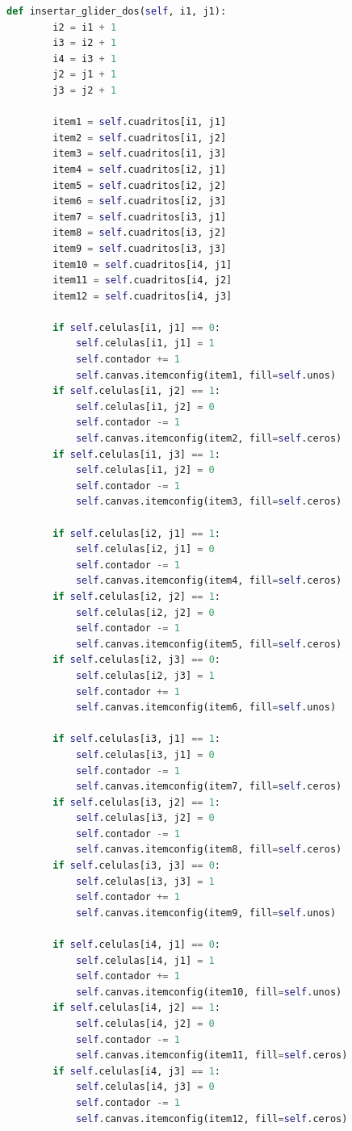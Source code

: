 \begin{lstlisting}[language=Python]
    def insertar_glider_dos(self, i1, j1):
        i2 = i1 + 1
        i3 = i2 + 1
        i4 = i3 + 1
        j2 = j1 + 1
        j3 = j2 + 1

        item1 = self.cuadritos[i1, j1]
        item2 = self.cuadritos[i1, j2]
        item3 = self.cuadritos[i1, j3]
        item4 = self.cuadritos[i2, j1]
        item5 = self.cuadritos[i2, j2]
        item6 = self.cuadritos[i2, j3]
        item7 = self.cuadritos[i3, j1]
        item8 = self.cuadritos[i3, j2]
        item9 = self.cuadritos[i3, j3]
        item10 = self.cuadritos[i4, j1]
        item11 = self.cuadritos[i4, j2]
        item12 = self.cuadritos[i4, j3]

        if self.celulas[i1, j1] == 0:
            self.celulas[i1, j1] = 1
            self.contador += 1
            self.canvas.itemconfig(item1, fill=self.unos)
        if self.celulas[i1, j2] == 1:
            self.celulas[i1, j2] = 0
            self.contador -= 1
            self.canvas.itemconfig(item2, fill=self.ceros)
        if self.celulas[i1, j3] == 1:
            self.celulas[i1, j2] = 0
            self.contador -= 1
            self.canvas.itemconfig(item3, fill=self.ceros)

        if self.celulas[i2, j1] == 1:
            self.celulas[i2, j1] = 0
            self.contador -= 1
            self.canvas.itemconfig(item4, fill=self.ceros)
        if self.celulas[i2, j2] == 1:
            self.celulas[i2, j2] = 0
            self.contador -= 1
            self.canvas.itemconfig(item5, fill=self.ceros)
        if self.celulas[i2, j3] == 0:
            self.celulas[i2, j3] = 1
            self.contador += 1
            self.canvas.itemconfig(item6, fill=self.unos)

        if self.celulas[i3, j1] == 1:
            self.celulas[i3, j1] = 0
            self.contador -= 1
            self.canvas.itemconfig(item7, fill=self.ceros)
        if self.celulas[i3, j2] == 1:
            self.celulas[i3, j2] = 0
            self.contador -= 1
            self.canvas.itemconfig(item8, fill=self.ceros)
        if self.celulas[i3, j3] == 0:
            self.celulas[i3, j3] = 1
            self.contador += 1
            self.canvas.itemconfig(item9, fill=self.unos)

        if self.celulas[i4, j1] == 0:
            self.celulas[i4, j1] = 1
            self.contador += 1
            self.canvas.itemconfig(item10, fill=self.unos)
        if self.celulas[i4, j2] == 1:
            self.celulas[i4, j2] = 0
            self.contador -= 1
            self.canvas.itemconfig(item11, fill=self.ceros)
        if self.celulas[i4, j3] == 1:
            self.celulas[i4, j3] = 0
            self.contador -= 1
            self.canvas.itemconfig(item12, fill=self.ceros)


\end{lstlisting}
